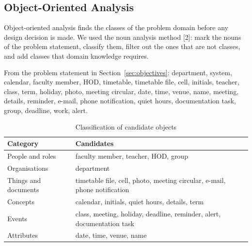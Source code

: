 
\subsection{Object-Oriented Analysis}
Object-oriented analysis finds the classes of the problem domain before any design decision is made. We used the noun analysis method [2]: mark the nouns of the problem statement, classify them, filter out the ones that are not classes, and add classes that domain knowledge requires.

From the problem statement in Section~\ref{sec:objectives}: department, system, calendar, faculty member, HOD, timetable, timetable file, cell, initials, teacher, class, term, holiday, photo, meeting circular, date, time, venue, name, meeting, details, reminder, e-mail, phone notification, quiet hours, documentation task, group, deadline, work, alert.

\begin{xltabular}{\textwidth}{|p{3.2cm}|Y|}
\caption{Classification of candidate objects}\\
\hline
\textbf{Category} & \textbf{Candidates} \\ \hline
People and roles & faculty member, teacher, HOD, group \\ \hline
Organisations & department \\ \hline
Things and documents & timetable file, cell, photo, meeting circular, e-mail, phone notification \\ \hline
Concepts & calendar, initials, quiet hours, details, term \\ \hline
Events & class, meeting, holiday, deadline, reminder, alert, documentation task \\ \hline
Attributes & date, time, venue, name \\ \hline
\end{xltabular}


